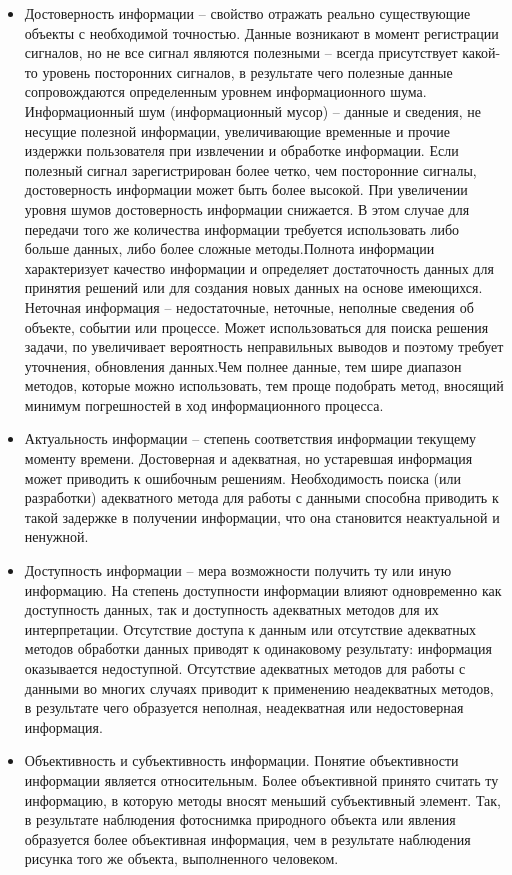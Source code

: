 \documentclass[a4paper]{article}
\begin{document}
\begin{itemize}
\item Достоверность информации – свойство отражать реально существующие объекты с необходимой точностью. Данные возникают в момент регистрации сигналов, но не все сигнал являются полезными – всегда присутствует какой-то уровень посторонних сигналов, в результате чего полезные данные сопровождаются определенным уровнем информационного шума. Информационный шум (информационный мусор) – данные и сведения, не несущие полезной информации, увеличивающие временные и прочие издержки пользователя при извлечении  и обработке информации. Если полезный сигнал зарегистрирован более четко, чем посторонние сигналы, достоверность информации может быть более высокой. При увеличении уровня шумов достоверность информации снижается. В этом случае для передачи того же количества информации требуется использовать либо больше данных, либо более сложные методы.Полнота информации характеризует качество информации и определяет достаточность данных для принятия решений или для создания новых данных на основе имеющихся. Неточная информация – недостаточные, неточные, неполные сведения об объекте, событии или процессе. Может использоваться для поиска решения задачи, по увеличивает вероятность неправильных выводов и поэтому требует уточнения, обновления данных.Чем полнее данные, тем шире диапазон методов, которые можно использовать, тем проще подобрать метод, вносящий минимум погрешностей в ход информационного процесса.

\item Актуальность информации – степень соответствия информации текущему моменту времени. Достоверная и адекватная, но устаревшая информация может приводить к ошибочным решениям. Необходимость поиска (или разработки) адекватного метода для работы с данными способна приводить к такой задержке в получении информации, что она становится неактуальной и ненужной.

\item Доступность информации – мера возможности получить ту или иную информацию. На степень доступности информации влияют одновременно как доступность данных, так и доступность адекватных методов для их интерпретации. Отсутствие доступа к данным или отсутствие адекватных методов обработки данных приводят к одинаковому результату: информация оказывается недоступной. Отсутствие адекватных методов для работы с данными во многих случаях приводит к применению неадекватных методов, в результате чего образуется неполная, неадекватная или недостоверная информация.

\item Объективность и субъективность информации. Понятие объективности информации является относительным. Более объективной принято считать ту информацию, в которую методы вносят меньший субъективный элемент. Так, в результате наблюдения фотоснимка природного объекта или явления образуется более объективная информация, чем в результате наблюдения рисунка того же объекта, выполненного человеком.

\end{itemize}
\end{document}
